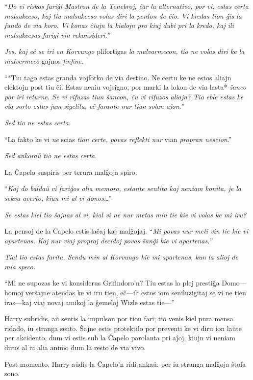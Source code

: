 ``\emph{Do vi riskos fariĝi Mastron de la Tenebroj, ĉar la
  alternativo, por vi, estas certa malsukceso, kaj tiu malsukceso
  volas diri la perdon de ĉio. Vi kredas tion ĝis la fundo de via
  koro. Vi konas ĉiujn la kialojn pro kiuj dubi pri la kredo, kaj ili
  malsukcesas farigi vin rekonsideri.''}

\emph{Jes, kaj eĉ se iri en Korvungo} plifortigas \emph{la
  malvarmecon, tio ne volas diri ke la malvermeco} gajnos
\emph{finfine}.

``*Tiu tago estas granda vojforko de via destino. Ne certu ke ne estos
aliajn elektojn post tiu ĉi. Estas neniu vojsigno, por marki la lokon
de via lasta* \emph{ŝanco por iri returne. Se vi rifuzas tiun ŝancon,
  ĉu vi rifuzos aliajn? Tio eble estas ke via sorto estas jam
  sigelita, eĉ farante nur tiun solan aĵon.}''

\emph{Sed tio ne estas certa.}

``La fakto ke vi \emph{ne} scias \emph{tion certe, povas reflekti nur}
vian \emph{propran nescion}.''

\emph{Sed ankoraŭ tio ne estas certa.}

La Ĉapelo suspiris per terura malĝoja spiro.

``\emph{Kaj do baldaŭ vi fariĝos alia memoro, estante sentita kaj
neniam konita, je la sekva averto, kiun mi al vi donos\ldots}''

\emph{Se estas kiel tio ŝajnas al vi, kial vi ne nur metas min tie kie
  vi volas ke mi iru?}

La pensoj de la Ĉapelo estis laĉaj kaj malĝojaj. ``\emph{Mi povas nur
  meti vin tie kie vi apartenas. Kaj nur viaj propraj decidoj povas ŝanĝi
  kie vi apartenas.''}

\emph{Tial tio estas farita. Sendu min al Korvungo kie mi apartenas,
  kun la alioj de mia speco.}

``Mi ne supozas ke vi konsiderus Grifindoro'n? Tiu estas la plej
prestiĝa Domo—homoj verŝajne atendas ke vi iru tien, eĉ—ili estos iom
seniluzigitaj se vi ne tien iras—kaj viaj novaj amikoj la ĝemeloj
Wizle estas tie—''

Harry subridis, aŭ sentis la impulson por tion fari; tio venis kiel
pura mensa ridado, iu stranga sento. Ŝajne estis protektilo por
preventi ke vi diru ion laŭte per akcidento, dum vi estis sub la
Ĉapelo parolanta pri aĵoj, kiujn vi neniam dirus al iu alia animo dum
la resto de via vivo.

Post momento, Harry aŭdis la Ĉapelo'n ridi ankaŭ, per iu stranga
malĝoja ŝtofa sono.

